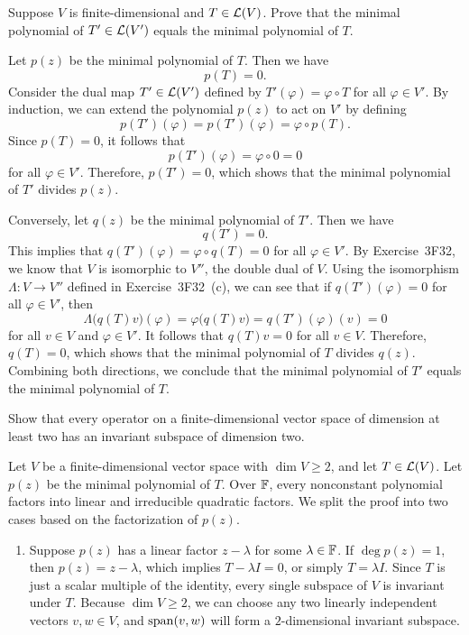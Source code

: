 \begin{exc}
\begin{exercise}
Suppose $V$ is finite-dimensional and $T\in\mathcal{L}(V)$. Prove that the minimal
polynomial of $T'\in\mathcal{L}(V')$ equals the minimal polynomial of $T$.
\end{exercise}
\begin{solution}
Let $p(z)$ be the minimal polynomial of $T$. Then we have
\[ p(T)=0. \]
Consider the dual map $T'\in\mathcal{L}(V')$ defined by $T'(\varphi)=\varphi\circ T$
for all $\varphi\in V'$. By induction, we can extend the polynomial $p(z)$ to
act on $V'$ by defining
\[ p(T')(\varphi)=p(T')(\varphi)=\varphi\circ p(T). \]
Since $p(T)=0$, it follows that
\[ p(T')(\varphi)=\varphi\circ0=0 \]
for all $\varphi\in V'$. Therefore, $p(T')=0$, which shows that the minimal
polynomial of $T'$ divides $p(z)$.

Conversely, let $q(z)$ be the minimal polynomial of $T'$. Then we have
\[ q(T')=0. \]
This implies that $q(T')(\varphi)=\varphi\circ q(T)=0$ for all
$\varphi\in V'$. By Exercise~3F32, we know that $V$ is isomorphic to $V''$,
the double dual of $V$. Using the isomorphism $\Lambda\colon V\to V''$ defined
in Exercise~3F32~(c), we can see that if $q(T')(\varphi)=0$ for all
$\varphi\in V'$, then
\[ \Lambda\bigl(q(T)v\bigr)(\varphi)=\varphi\bigl(q(T)v\bigr)
   =q(T')(\varphi)(v)=0 \]
for all $v\in V$ and $\varphi\in V'$. It follows that $q(T)v=0$ for all
$v\in V$. Therefore, $q(T)=0$, which shows that the minimal polynomial of $T$
divides $q(z)$. Combining both directions, we conclude that the minimal
polynomial of $T'$ equals the minimal polynomial of $T$.
\end{solution}

\begin{exercise}
Show that every operator on a finite-dimensional vector space of dimension at
least two has an invariant subspace of dimension two.
\end{exercise}
\begin{solution}
Let $V$ be a finite-dimensional vector space with $\dim V\ge2$, and let
$T\in\mathcal{L}(V)$. Let $p(z)$ be the minimal polynomial of $T$. Over $\mathbb{F}$, every
nonconstant polynomial factors into linear and irreducible quadratic factors.
We split the proof into two cases based on the factorization of $p(z)$.
\begin{enumerate}[label=\arabic*)]
\item Suppose $p(z)$ has a linear factor $z-\lambda$ for some $\lambda\in\mathbb{F}$.
  If $\deg p(z)=1$, then $p(z)=z-\lambda$, which implies $T-\lambda I=0$, or
  simply $T=\lambda I$. Since $T$ is just a scalar multiple of the identity,
  every single subspace of $V$ is invariant under $T$. Because $\dim V\ge2$,
  we can choose any two linearly independent vectors $v,w\in V$, and
  $\operatorname{span}(v,w)$ will form a $2$-dimensional invariant subspace.


\end{enumerate}
\end{solution}
\end{exc}
